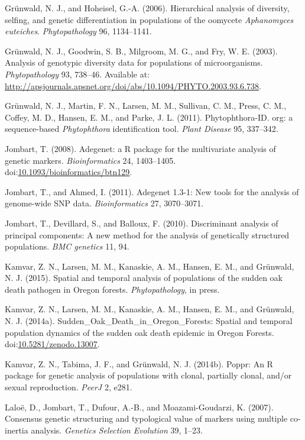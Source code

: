 \documentclass{frontiersSCNS} %
\begin{document}
Gr{\"{u}}nwald, N. J., and Hoheisel, G.-A. (2006). Hierarchical analysis of
diversity, selfing, and genetic differentiation in populations of the
oomycete \emph{Aphanomyces euteiches}. \emph{Phytopathology} 96,
1134--1141.

Gr\"{u}nwald, N. J., Goodwin, S. B., Milgroom, M. G., and Fry, W. E. (2003).
Analysis of genotypic diversity data for populations of microorganisms.
\emph{Phytopathology} 93, 738--46. Available at:
\url{http://apsjournals.apsnet.org/doi/abs/10.1094/PHYTO.2003.93.6.738}.

Gr{\"{u}}nwald, N. J., Martin, F. N., Larsen, M. M., Sullivan, C. M., Press,
C. M., Coffey, M. D., Hansen, E. M., and Parke, J. L. (2011).
Phytophthora-ID. org: a sequence-based \emph{Phytophthora}
identification tool. \emph{Plant Disease} 95, 337--342.

Jombart, T. (2008). Adegenet: a R package for the multivariate analysis
of genetic markers. \emph{Bioinformatics} 24, 1403--1405.
doi:\href{http://dx.doi.org/10.1093/bioinformatics/btn129}{10.1093/bioinformatics/btn129}.

Jombart, T., and Ahmed, I. (2011). Adegenet 1.3-1: New tools for the
analysis of genome-wide SNP data. \emph{Bioinformatics} 27, 3070--3071.

Jombart, T., Devillard, S., and Balloux, F. (2010). Discriminant
analysis of principal components: A new method for the analysis of
genetically structured populations. \emph{BMC genetics} 11, 94.

Kamvar, Z. N., Larsen, M. M., Kanaskie, A. M., Hansen, E. M., and
Gr\"{u}nwald, N. J. (2015). Spatial and temporal analysis of populations of
the sudden oak death pathogen in Oregon forests. \emph{Phytopathology},
in press.

Kamvar, Z. N., Larsen, M. M., Kanaskie, A. M., Hansen, E. M., and
Gr\"{u}nwald, N. J. (2014a). Sudden\_Oak\_Death\_in\_Oregon\_Forests:
Spatial and temporal population dynamics of the sudden oak death
epidemic in Oregon Forests.
doi:\href{http://dx.doi.org/10.5281/zenodo.13007}{10.5281/zenodo.13007}.

Kamvar, Z. N., Tabima, J. F., and Gr{\"{u}}nwald, N. J. (2014b). Poppr: An R
package for genetic analysis of populations with clonal, partially
clonal, and/or sexual reproduction. \emph{PeerJ} 2, e281.

Lalo{\"{e}}, D., Jombart, T., Dufour, A.-B., and Moazami-Goudarzi, K.
(2007). Consensus genetic structuring and typological value of markers
using multiple co-inertia analysis. \emph{Genetics Selection Evolution}
39, 1--23.
\end{document}
